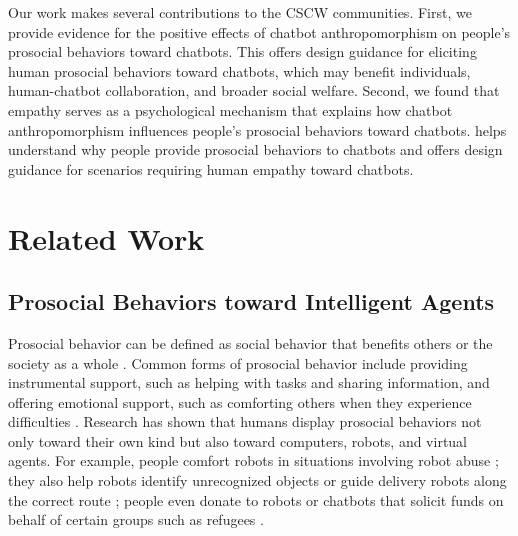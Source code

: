 Our work makes several contributions to the CSCW communities. First, we provide evidence for the positive effects of chatbot anthropomorphism on people’s prosocial behaviors toward chatbots. This offers design guidance for eliciting human prosocial behaviors toward chatbots, which may benefit individuals, human-chatbot collaboration, and broader social welfare. Second, we found that empathy serves as a psychological mechanism that explains how chatbot anthropomorphism influences people's prosocial behaviors toward chatbots.  helps understand why people provide prosocial behaviors to chatbots and offers design guidance for scenarios requiring human empathy toward chatbots. 

\section{Related Work}
\subsection{Prosocial Behaviors toward Intelligent Agents}
Prosocial behavior can be defined as social behavior that benefits others or the society as a whole \cite{penner2005prosocial, twenge2007social}. Common forms of prosocial behavior include providing instrumental support, such as helping with tasks and sharing information, and offering emotional support, such as comforting others when they experience difficulties \cite{NIELSEN2022260,OLIVEIRA2021106547}. Research has shown that humans display prosocial behaviors not only toward their own kind but also toward computers, robots, and virtual agents. For example, people comfort robots in situations involving robot abuse \cite{Connolly2020robotabuse}; they also help robots identify unrecognized objects or guide delivery robots along the correct route \cite{kuhnlenz2018effect, singh2023behavior}; people even donate to robots or chatbots that solicit funds on behalf of certain groups such as refugees \cite{Kim2014donate, namkoong2023effect}. 


